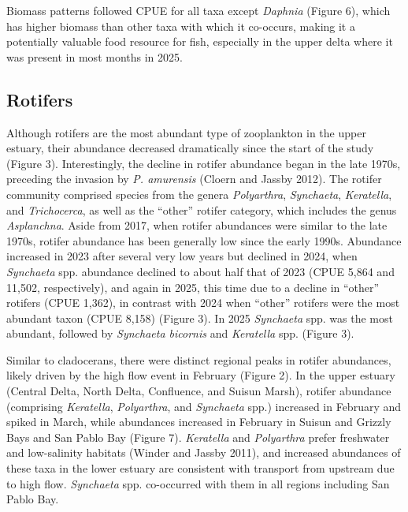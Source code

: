 \documentclass[
  letterpaper,
]{article}
\begin{document}
Biomass patterns followed CPUE for all taxa except \emph{Daphnia}
(Figure 6), which has higher biomass than other taxa with which it
co-occurs, making it a potentially valuable food resource for fish,
especially in the upper delta where it was present in most months in
2025.

\subsection{Rotifers}\label{rotifers}

Although rotifers are the most abundant type of zooplankton in the upper
estuary, their abundance decreased dramatically since the start of the
study (Figure 3). Interestingly, the decline in rotifer abundance began
in the late 1970s, preceding the invasion by \emph{P. amurensis} (Cloern
and Jassby 2012). The rotifer community comprised species from the
genera \emph{Polyarthra}, \emph{Synchaeta}, \emph{Keratella}, and
\emph{Trichocerca}, as well as the ``other'' rotifer category, which
includes the genus \emph{Asplanchna}. Aside from 2017, when rotifer
abundances were similar to the late 1970s, rotifer abundance has been
generally low since the early 1990s. Abundance increased in 2023 after
several very low years but declined in 2024, when \emph{Synchaeta} spp.
abundance declined to about half that of 2023 (CPUE 5,864 and 11,502,
respectively), and again in 2025, this time due to a decline in
``other'' rotifers (CPUE 1,362), in contrast with 2024 when ``other''
rotifers were the most abundant taxon (CPUE 8,158) (Figure 3). In 2025
\emph{Synchaeta} spp. was the most abundant, followed by \emph{Synchaeta
bicornis} and \emph{Keratella} spp. (Figure 3).

Similar to cladocerans, there were distinct regional peaks in rotifer
abundances, likely driven by the high flow event in February (Figure 2).
In the upper estuary (Central Delta, North Delta, Confluence, and Suisun
Marsh), rotifer abundance (comprising \emph{Keratella},
\emph{Polyarthra}, and \emph{Synchaeta} spp.) increased in February and
spiked in March, while abundances increased in February in Suisun and
Grizzly Bays and San Pablo Bay (Figure 7). \emph{Keratella} and
\emph{Polyarthra} prefer freshwater and low-salinity habitats (Winder
and Jassby 2011), and increased abundances of these taxa in the lower
estuary are consistent with transport from upstream due to high flow.
\emph{Synchaeta} spp. co-occurred with them in all regions including San
Pablo Bay.
\end{document}
